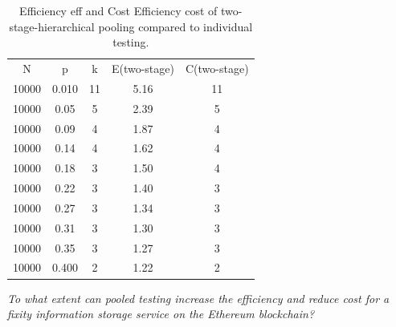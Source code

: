 \begin{table}[t]
    \centering
    \begin{tabular}{ c c c c c}
        N & p & k & E(\acrshort{two-stage}) & C(\acrshort{two-stage}) \\
        10000 & 0.010 & 11 & 5.16 & 11 \\ 
        \hline
        10000 & 0.05 & 5 & 2.39 & 5 \\  
        \hline
        10000 & 0.09 & 4 & 1.87 & 4 \\  
        \hline
        10000 & 0.14 & 4 & 1.62 & 4 \\  
        \hline
        10000 & 0.18 & 3 & 1.50 & 4  \\
        \hline
        10000 & 0.22 & 3 & 1.40 & 3  \\
        \hline
        10000 & 0.27 & 3 & 1.34 & 3  \\
        \hline
        10000 & 0.31 & 3 & 1.30 & 3  \\
        \hline
        10000 & 0.35 & 3 & 1.27 & 3  \\
        \hline
        10000 & 0.400 & 2 & 1.22 & 2  
    \end{tabular}
    \caption{Efficiency \acrshort{eff} and Cost Efficiency \acrshort{cost} of two-stage-hierarchical pooling compared to individual testing.}
    \label{tb:expected costs}
\end{table}

\textit{To what extent can pooled testing increase the efficiency and reduce cost for a fixity information storage service on the Ethereum blockchain?}

